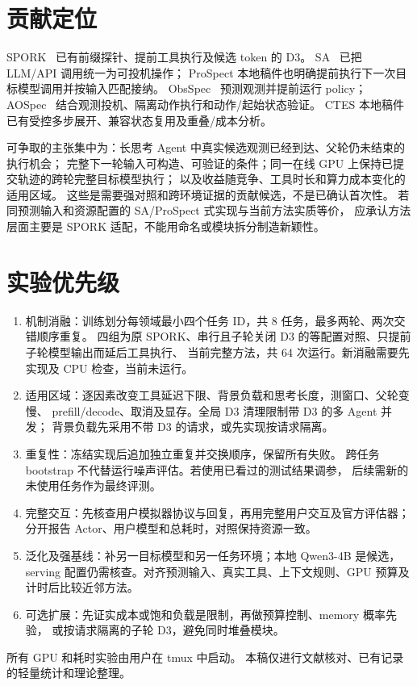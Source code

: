 \documentclass[UTF8,11pt]{ctexart}
\begin{document}
\section{贡献定位}
SPORK~\cite{spork} 已有前缀探针、提前工具执行及候选 token 的 D3。
SA~\cite{sa} 已把 LLM/API 调用统一为可投机操作；
ProSpect 本地稿件也明确提前执行下一次目标模型调用并按输入匹配接纳。
ObsSpec~\cite{obsspec} 预测观测并提前运行 policy；
AOSpec~\cite{aospec} 结合观测投机、隔离动作执行和动作/起始状态验证。
CTES 本地稿件已有受控多步展开、兼容状态复用及重叠/成本分析。

可争取的主张集中为：长思考 Agent 中真实候选观测已经到达、父轮仍未结束的执行机会；
完整下一轮输入可构造、可验证的条件；同一在线 GPU 上保持已提交轨迹的跨轮完整目标模型执行；
以及收益随竞争、工具时长和算力成本变化的适用区域。
这些是需要强对照和跨环境证据的贡献候选，不是已确认首次性。
若同预测输入和资源配置的 SA/ProSpect 式实现与当前方法实质等价，
应承认方法层面主要是 SPORK 适配，不能用命名或模块拆分制造新颖性。

\section{实验优先级}
\begin{enumerate}
\item 机制消融：训练划分每领域最小四个任务 ID，共 8 任务，最多两轮、两次交错顺序重复。
四组为原 SPORK、串行且子轮关闭 D3 的等配置对照、只提前子轮模型输出而延后工具执行、
当前完整方法，共 64 次运行。新消融需要先实现及 CPU 检查，当前未运行。
\item 适用区域：逐因素改变工具延迟下限、背景负载和思考长度，测窗口、父轮变慢、
prefill/decode、取消及显存。全局 D3 清理限制带 D3 的多 Agent 并发；
背景负载先采用不带 D3 的请求，或先实现按请求隔离。
\item 重复性：冻结实现后追加独立重复并交换顺序，保留所有失败。
跨任务 bootstrap 不代替运行噪声评估。若使用已看过的测试结果调参，
后续需新的未使用任务作为最终评测。
\item 完整交互：先核查用户模拟器协议与回复，再用完整用户交互及官方评估器；
分开报告 Actor、用户模型和总耗时，对照保持资源一致。
\item 泛化及强基线：补另一目标模型和另一任务环境；本地 Qwen3-4B 是候选，
serving 配置仍需核查。对齐预测输入、真实工具、上下文规则、GPU 预算及计时后比较近邻方法。
\item 可选扩展：先证实成本或饱和负载是限制，再做预算控制、memory 概率先验，
或按请求隔离的子轮 D3，避免同时堆叠模块。
\end{enumerate}
所有 GPU 和耗时实验由用户在 tmux 中启动。
本稿仅进行文献核对、已有记录的轻量统计和理论整理。
\end{document}
